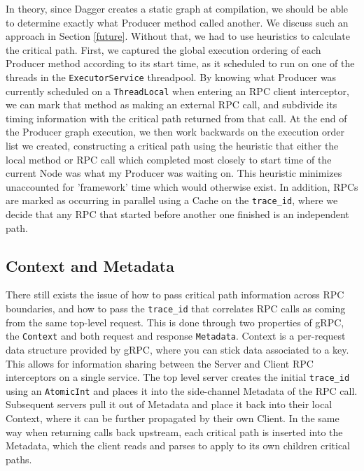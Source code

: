 \documentclass[11pt, twoside, twocolumn]{extarticle}
\begin{document}
In theory, since Dagger creates a static graph at compilation, we should be able to determine exactly what Producer method called another. We discuss such an approach in Section \ref{future}. Without that, we had to use heuristics to calculate the critical path. First, we captured the global execution ordering of each Producer method according to its start time, as it scheduled to run on one of the threads in the \lstinline{ExecutorService} threadpool. By knowing what Producer was currently scheduled on a \lstinline{ThreadLocal} when entering an RPC client interceptor, we can mark that method as making an external RPC call, and subdivide its timing information with the critical path returned from that call. At the end of the Producer graph execution, we then work backwards on the execution order list we created, constructing a critical path using the heuristic that either the local method or RPC call which completed most closely to start time of the current Node was what my Producer was waiting on.  This heuristic minimizes unaccounted for 'framework' time which would otherwise exist. In addition, RPCs are marked as occurring in parallel using a Cache on the \lstinline{trace_id}, where we decide that any RPC that started before another one finished is an independent path.

\subsection{Context and Metadata}

There still exists the issue of how to pass critical path information across RPC boundaries, and how to pass the \lstinline{trace_id} that correlates RPC calls as coming from the same top-level request. This is done through two properties of gRPC, the \lstinline{Context} and both request and response \lstinline{Metadata}.  Context is a per-request data structure provided by gRPC, where you can stick data associated to a key.  This allows for information sharing between the Server and Client RPC interceptors on a single service.  The top level server creates the initial \lstinline{trace_id} using an \lstinline{AtomicInt} and places it into the side-channel Metadata of the RPC call. Subsequent servers pull it out of Metadata and place it back into their local Context, where it can be further propagated by their own Client.  In the same way when returning calls back upstream, each critical path is inserted into the Metadata, which the client reads and parses to apply to its own children critical paths.
\end{document}
